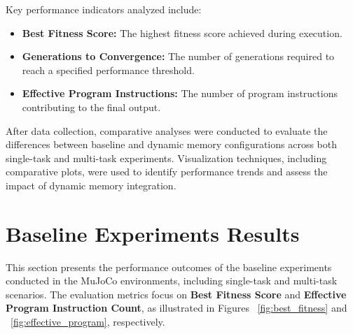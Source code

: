 \documentclass[sigconf]{acmart}
\begin{document}
Key performance indicators analyzed include:

\begin{itemize}
  \item \textbf{Best Fitness Score:} The highest fitness score achieved during execution.
  \item \textbf{Generations to Convergence:} The number of generations required to reach a specified performance threshold.
  \item \textbf{Effective Program Instructions:} The number of program instructions contributing to the final output.
\end{itemize}

After data collection, comparative analyses were conducted to evaluate the differences between baseline and dynamic memory configurations
across both single-task and multi-task experiments. Visualization techniques, including comparative plots, were used to identify performance
trends and assess the impact of dynamic memory integration.




\section{Baseline Experiments Results}
This section presents the performance outcomes of the baseline experiments conducted in 
the MuJoCo environments, including single-task and multi-task scenarios. The evaluation 
metrics focus on \textbf{Best Fitness Score} and \textbf{Effective Program Instruction Count}, as illustrated in 
Figures ~\ref{fig:best_fitness} and ~\ref{fig:effective_program}, respectively.
\end{document}
